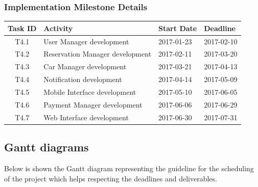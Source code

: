 \documentclass{article}
\begin{document}
		\subsubsection{Implementation Milestone Details}
		\begin{table}[h!]
			\centering
			\begin{tabular}{| c | l | l | l |}
				\hline
				\textbf{Task ID}   &\textbf{Activity}   & \textbf{Start Date}   & \textbf{Deadline} \\
				\hline
				T4.1 &  User Manager development            & 2017-01-23            & 2017-02-10        \\\hline
				T4.2 &  Reservation Manager development     & 2017-02-11            & 2017-03-20        \\\hline
				T4.3 &  Car Manager development             & 2017-03-21            & 2017-04-13        \\\hline
				T4.4 &  Notification development            & 2017-04-14            & 2017-05-09        \\\hline
				T4.5 &  Mobile Interface development        & 2017-05-10            & 2017-06-05        \\\hline
				T4.6 &  Payment Manager development         & 2017-06-06            & 2017-06-29        \\\hline
				T4.7 &  Web Interface development           & 2017-06-30            & 2017-07-31        \\\hline
			\end{tabular}
		\end{table}
		\pagebreak
	
		\subsection{Gantt diagrams}
		Below is shown the Gantt diagram representing the guideline for the scheduling of the project which helps respecting the deadlines and deliverables.\\
		\begin{minipage}{\linewidth}
			\vspace{5mm}
			\vspace{5mm}
		\end{minipage}
		
\end{document}
